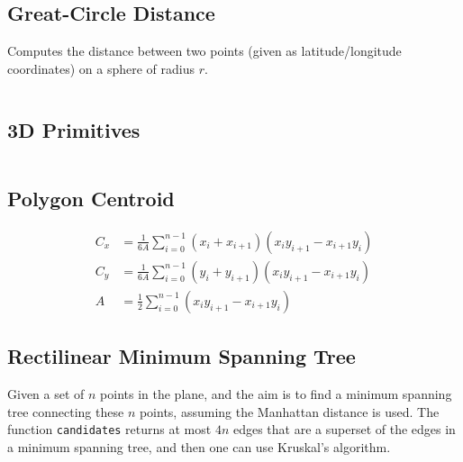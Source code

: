 \documentclass[8pt,a4paper,landscape,oneside]{amsart}
\newcommand{\mintedstyle}[2]{\inputminted[fontsize=\normalsize,baselinestretch=.9,breaklines,breakautoindent,tabsize=2]{#1}{code/#2}}
\newcommand{\code}[1]{\mintedstyle{cpp}{#1}}
\begin{document}
\begin{multicols*}{3}
\subsection{Great-Circle Distance}
Computes the distance between two points (given as latitude/longitude
coordinates) on a sphere of radius $r$.
\code{geometry/gc_distance.cpp}

\subsection{3D Primitives}
\code{geometry/primitives3d.cpp}

\subsection{Polygon Centroid}
\begin{align*}
  C_x &= \frac{1}{6A}\sum_{i=0}^{n-1}(x_i+x_{i+1})(x_iy_{i+1} - x_{i+1}y_i) \\
  C_y &= \frac{1}{6A}\sum_{i=0}^{n-1}(y_i+y_{i+1})(x_iy_{i+1} - x_{i+1}y_i) \\
  A &= \frac12\sum_{i=0}^{n-1}(x_iy_{i+1}-x_{i+1}y_i)
\end{align*}

\subsection{Rectilinear Minimum Spanning Tree}
Given a set of $n$ points in the plane, and the aim is to find a
minimum spanning tree connecting these $n$ points, assuming the
Manhattan distance is used. The function \texttt{candidates} returns at
most $4n$ edges that are a superset of the edges in a minimum spanning
tree, and then one can use Kruskal's algorithm.
\code{geometry/rmst.cpp}


\end{multicols*}
\end{document}

